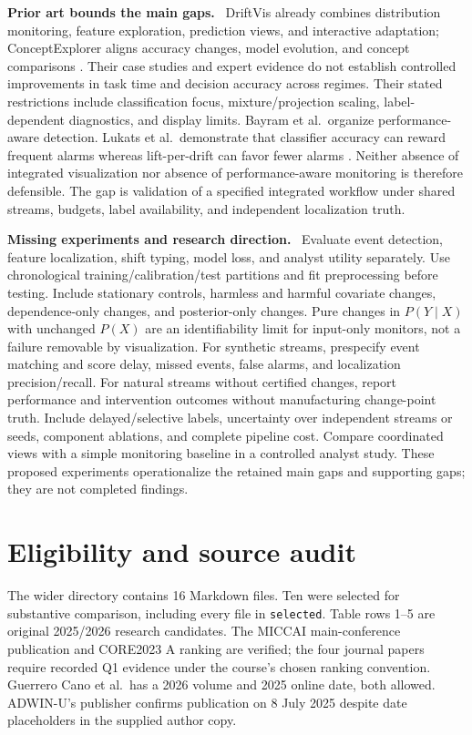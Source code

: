 \documentclass[10pt,a4paper]{article}
\newcommand{\lead}[1]{\textbf{#1}\ }
\begin{document}
\lead{Prior art bounds the main gaps.}
DriftVis already combines distribution monitoring, feature exploration, prediction views, and interactive adaptation; ConceptExplorer aligns accuracy changes, model evolution, and concept comparisons \cite{driftvis,conceptexplorer}. Their case studies and expert evidence do not establish controlled improvements in task time and decision accuracy across regimes. Their stated restrictions include classification focus, mixture/projection scaling, label-dependent diagnostics, and display limits. Bayram et al.\ organize performance-aware detection. Lukats et al.\ demonstrate that classifier accuracy can reward frequent alarms whereas lift-per-drift can favor fewer alarms \cite{bayram,lukats}. Neither absence of integrated visualization nor absence of performance-aware monitoring is therefore defensible. The gap is validation of a specified integrated workflow under shared streams, budgets, label availability, and independent localization truth.

\lead{Missing experiments and research direction.}
Evaluate event detection, feature localization, shift typing, model loss, and analyst utility separately. Use chronological training/calibration/test partitions and fit preprocessing before testing. Include stationary controls, harmless and harmful covariate changes, dependence-only changes, and posterior-only changes. Pure changes in $P(Y\mid X)$ with unchanged $P(X)$ are an identifiability limit for input-only monitors, not a failure removable by visualization. For synthetic streams, prespecify event matching and score delay, missed events, false alarms, and localization precision/recall. For natural streams without certified changes, report performance and intervention outcomes without manufacturing change-point truth. Include delayed/selective labels, uncertainty over independent streams or seeds, component ablations, and complete pipeline cost. Compare coordinated views with a simple monitoring baseline in a controlled analyst study. These proposed experiments operationalize the retained main gaps and supporting gaps; they are not completed findings.

\clearpage
\section{Eligibility and source audit}
The wider directory contains 16 Markdown files. Ten were selected for substantive comparison, including every file in \texttt{selected}. Table rows 1--5 are original 2025/2026 research candidates. The MICCAI main-conference publication and CORE2023 A ranking are verified; the four journal papers require recorded Q1 evidence under the course's chosen ranking convention. Guerrero Cano et al.\ has a 2026 volume and 2025 online date, both allowed. ADWIN-U's publisher confirms publication on 8 July 2025 despite date placeholders in the supplied author copy.
\end{document}
